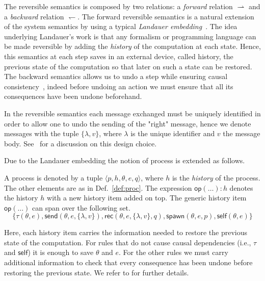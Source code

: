 \documentclass[runningheads]{llncs}
\newcommand{\ms}[1]{\mathsf{#1}}
\newcommand{\lh}{\leftharpoondown}
\newcommand{\rh}{\rightharpoonup}
\let\l=\langle
\let\r=\rangle
\begin{document}
The reversible semantics is composed by two relations: a \emph{forward} relation $\rh$ and a \emph{backward} relation $\lh$.
The forward reversible semantics is a natural extension of the
system semantics by using a typical \emph{Landauer embedding}~\cite{Landauer}.
The idea underlying Landauer's work is that any formalism or programming
language can be made reversible by adding the \emph{history} of the computation at
each state. Hence, this semantics at each step saves in an external device,
called history, the previous state of the computation so that later on such a
state can be restored. The backward semantics allows us to
undo a step while ensuring causal consistency~\cite{DanosK04,Lanese14}, indeed
before undoing an action we must ensure that all its consequences have been
undone beforehand.

In the reversible semantics each message exchanged must be uniquely identified
in order to allow one to undo the sending of the "right" message, hence we denote messages with the tuple $\{\lambda, v\}$, where
$\lambda$ is the unique identifier and $v$ the message body. See~\cite{LaneseNPV18} for a discussion on this design choice.

Due to the Landauer embedding the notion of process is extended as follows.

\begin{definition}[Process]\label{def:rev-proc}
  A process is denoted by a tuple $\l p, h, \theta, e, q \r$, where $h$ is the \emph{history} of the process. The other elements are as in Def.~\ref{def:proc}. The expression $\ms{op}(\ldots): h$ denotes the history $h$ with a new history item added on top.
The generic history item $\ms{op}(\ldots)$ can span over the following set.
\[ \{ \tau(\theta, e), \ms{send}(\theta, e, \{\lambda, v\}), \ms{rec}(\theta, e, \{\lambda, v\}, q), \ms{spawn}(\theta, e, p), \ms{self}(\theta, e)\}\]
\end{definition}


Here, each history item carries the information needed to restore the
previous state of the computation. For rules that do not cause causal
dependencies (i.e., $\tau$ and $\ms{self}$) it is enough to save $\theta$ and
$e$. For the other rules we must carry additional information to
check that every consequence has been undone before restoring the previous state.
We refer to \cite{LaneseNPV18} for further details.
%
\end{document}
